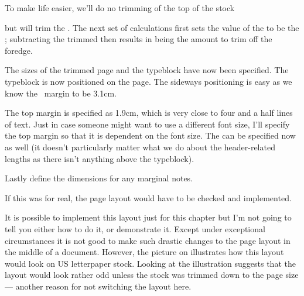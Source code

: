     To make life easier, we'll do no trimming of the top of the 
stock
\begin{lcode}
\setlength{\trimtop}{0pt}
\end{lcode}
but will trim the \foredge. The next set of calculations first sets the 
value of the \lnc{\trimedge} to be the \lnc{\stockwidth}; subtracting the
trimmed \lnc{\paperwidth} then results in \lnc{\trimedge} being the amount
to trim off the foredge.
\begin{lcode}
\setlength{\trimedge}{\stockwidth}
\addtolength{\trimedge}{-\paperwidth}
\end{lcode}

    The sizes of the trimmed page and the typeblock have 
now been specified. The typeblock is now positioned on 
the page. The sideways positioning is
easy as we know the \foredge\ margin 
to be 3.1cm.
\begin{lcode}
\setlrmargins{*}{3.1cm}{*}
\end{lcode}
The top margin is specified as 1.9cm, which is very 
close to 
four and a half lines of text. Just in case someone might want to use a 
different font size, I'll specify the top margin 
so that it 
is dependent on the font size. The
\lnc{\footskip} can be specified now as well (it doesn't particularly matter
what we do about the header-related lengths as there isn't anything above
the typeblock).
\begin{lcode}
\setulmargins{4.5\onelineskip}{*}{*}
\setheadfoot{\onelineskip}{3\onelineskip}
\setheaderspaces{\onelineskip}{*}{*}
\end{lcode}

    Lastly define the dimensions for any marginal notes.
\begin{lcode}
\setmarginnotes{17pt}{51pt}{\onelineskip}
\end{lcode}

    If this was for real, the page layout would have to be checked and
implemented.
\begin{lcode}
\checkandfixthelayout[lines]
\end{lcode}

    It is possible to implement this layout just for this chapter but
I'm not going to tell you either how to do it, or demonstrate it. Except
under exceptional circumstances it is not good to make such drastic changes
to the page layout in the middle of a document. However, the picture on
 illustrates
how this layout would look on US letterpaper 
stock. Looking at the illustration suggests that the layout 
would look rather odd unless the stock was trimmed down
to the page size --- another reason for not switching the layout here.

